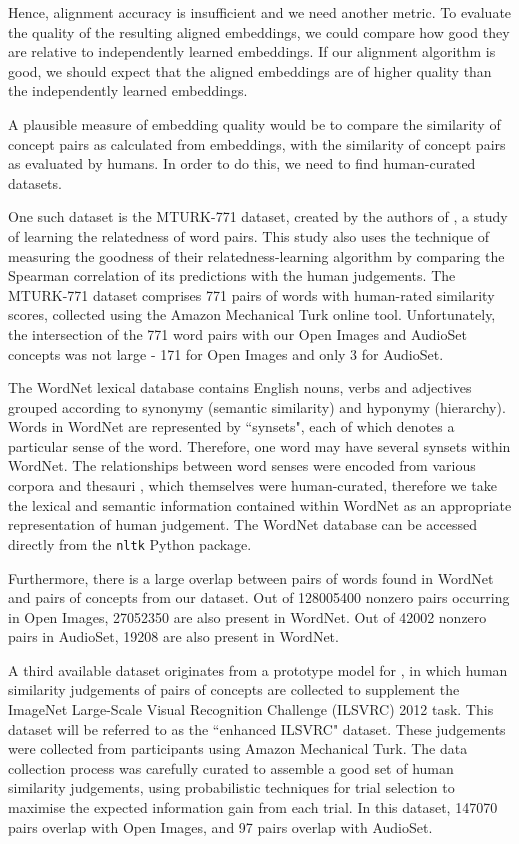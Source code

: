 Hence, alignment accuracy is insufficient and we need another metric. To evaluate the quality of the resulting aligned embeddings, we could compare how good they are relative to independently learned embeddings. If our alignment algorithm is good, we should expect that the aligned embeddings are of higher quality than the independently learned embeddings. 

A plausible measure of embedding quality would be to compare the similarity of concept pairs as calculated from embeddings, with the similarity of concept pairs as evaluated by humans. In order to do this, we need to find human-curated datasets.

One such dataset is the MTURK-771 dataset, created by the authors of \cite{mturk771}, a study of learning the relatedness of word pairs. This study also uses the technique of measuring the goodness of their relatedness-learning algorithm by comparing the Spearman correlation of its predictions with the human judgements. The MTURK-771 dataset comprises 771 pairs of words with human-rated similarity scores, collected using the Amazon Mechanical Turk online tool. Unfortunately, the intersection of the 771 word pairs with our Open Images and AudioSet concepts was not large - 171 for Open Images and only 3 for AudioSet. 

The WordNet \cite{WordNet} lexical database contains English nouns, verbs and adjectives grouped according to synonymy (semantic similarity) and hyponymy (hierarchy). Words in WordNet are represented by ``synsets", each of which denotes a particular sense of the word. Therefore, one word may have several synsets within WordNet. The relationships between word senses were encoded from various corpora and thesauri , which themselves were human-curated, therefore we take the lexical and semantic information contained within WordNet as an appropriate representation of human judgement. The WordNet database can be accessed directly from the \texttt{nltk} Python package. 

Furthermore, there is a large overlap between pairs of words found in WordNet and pairs of concepts from our dataset.  Out of 128005400 nonzero pairs occurring in Open Images, 27052350 are also present in WordNet. Out of 42002 nonzero pairs in AudioSet, 19208 are also present in WordNet. 

A third available dataset originates from a prototype model for \cite{RoadsLoveCVPR}, in which human similarity judgements of pairs of concepts are collected to supplement the ImageNet Large-Scale Visual Recognition Challenge (ILSVRC) 2012 task. This dataset will be referred to as the ``enhanced ILSVRC" dataset. These judgements were collected from participants using Amazon Mechanical Turk. The data collection process was carefully curated to assemble a good set of human similarity judgements, using probabilistic techniques for trial selection to maximise the expected information gain from each trial. In this dataset, 147070 pairs overlap with Open Images, and 97 pairs overlap with AudioSet. 

